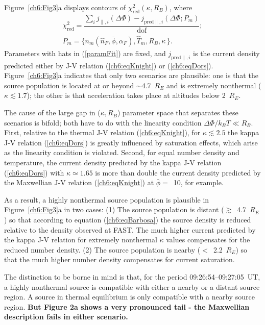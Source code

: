   Figure~\ref{ch6:Fig3}a displays contours of $\chi^2_{\textrm{red}} ( \kappa,
  R_B )$, where
  \begin{subequations}
    \begin{align} \chi^2_{\mathrm{red}} = \dfrac{\sum_i j_{\parallel,i} (\Delta \Phi) - j_{\textrm{pred}\parallel,i}(\Delta \Phi; P_m)}{\mathrm{dof}}; \\
      P_m = \Big \{ n_m ( \hat{n}_F, \bar{\phi} , \alpha_F ),
      \hat{T}_m, R_B, \kappa \, \Big \}. \label{paramFit}
    \end{align}
  \end{subequations}
  Parameters with hats in (\ref{paramFit}) are fixed, and
  $j_{\textrm{pred}\parallel,i} $ is the current density predicted either by J-V
  relation (\ref{ch6:eqKnight}) or (\ref{ch6:eqDors}). Figure~\ref{ch6:Fig3}a
  indicates that only two scenarios are plausible: one is that the source
  population is located at or beyond $\sim$4.7~$R_E$ and is extremely nonthermal
  ($\kappa \lesssim 1.7$); the other is that acceleration takes place at
  altitudes below 2~$R_E$.

  The cause of the large gap in ($\kappa, R_B$) parameter space that separates
  these scenarios is bifold; both have to do with the linearity condition
  $\Delta \Phi / k_B T \ll R_B $. First, relative to the thermal J-V relation
  (\ref{ch6:eqKnight}), for $\kappa \lesssim 2.5$ the kappa J-V relation
  (\ref{ch6:eqDors}) is greatly influenced by saturation effects, which arise as
  the linearity condition is violated. Second, for equal number density and
  temperature, the current density predicted by the kappa J-V relation
  (\ref{ch6:eqDors}) with $\kappa \simeq 1.65$ is more than double the current
  density predicted by the Maxwellian J-V relation (\ref{ch6:eqKnight}) at
  $\bar{\phi} =$~10, for example.

  As a result, a highly nonthermal source population is plausible in
  Figure~\ref{ch6:Fig3}a in two cases: (1) The source population is distant
  ($\gtrsim$~4.7~$R_E$) so that according to equation (\ref{ch6:eqBarbosa}) the
  source density is reduced relative to the density observed at FAST. The much
  higher current predicted by the kappa J-V relation for extremely nonthermal
  $\kappa$ values compensates for the reduced number density. (2) The source
  population is nearby ($<$~2.2~$R_E$) so that the much higher number density
  compensates for current saturation.

  The distinction to be borne in mind is that, for the period
  09:26:54--09:27:05~UT, a highly nonthermal source is compatible with either a
  nearby or a distant source region. A source in thermal equilibrium is only
  compatible with a nearby source region. \textbf{But Figure 2a shows a very
    pronounced tail - the Maxwellian description fails in either scenario.}

